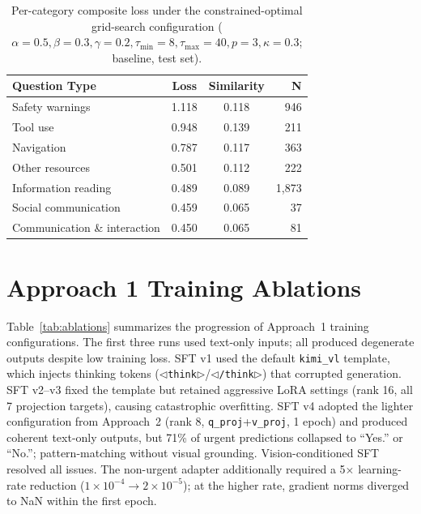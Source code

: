 \documentclass{article}
\begin{document}
\begin{table}[H]
\centering
\caption{Per-category composite loss under the constrained-optimal grid-search configuration ($\alpha\!=\!0.5, \beta\!=\!0.3, \gamma\!=\!0.2, \tau_{\min}\!=\!8, \tau_{\max}\!=\!40, p\!=\!3, \kappa\!=\!0.3$; baseline, test set).}
\label{tab:per_type}
\begin{tabular}{lccr}
\toprule
\textbf{Question Type} & \textbf{Loss} & \textbf{Similarity} & \textbf{N} \\
\midrule
Safety warnings              & 1.118 & 0.118 & 946 \\
Tool use                     & 0.948 & 0.139 & 211 \\
Navigation                   & 0.787 & 0.117 & 363 \\
Other resources              & 0.501 & 0.112 & 222 \\
Information reading          & 0.489 & 0.089 & 1{,}873 \\
Social communication         & 0.459 & 0.065 & 37 \\
Communication \& interaction & 0.450 & 0.065 & 81 \\
\bottomrule
\end{tabular}
\end{table}



\section{Approach 1 Training Ablations}\label{app:ablations}
 
Table~\ref{tab:ablations} summarizes the progression of Approach~1 training configurations. The first three runs used text-only inputs; all produced degenerate outputs despite low training loss. SFT v1 used the default \texttt{kimi\_vl} template, which injects thinking tokens (\texttt{{\small$\triangleleft$}think$\triangleright$}/\texttt{{\small$\triangleleft$}/think$\triangleright$}) that corrupted generation. SFT v2--v3 fixed the template but retained aggressive LoRA settings (rank 16, all 7 projection targets), causing catastrophic overfitting. SFT v4 adopted the lighter configuration from Approach~2 (rank 8, \texttt{q\_proj}+\texttt{v\_proj}, 1 epoch) and produced coherent text-only outputs, but 71\% of urgent predictions collapsed to ``Yes.'' or ``No.''; pattern-matching without visual grounding. Vision-conditioned SFT resolved all issues. The non-urgent adapter additionally required a 5$\times$ learning-rate reduction ($1 \times 10^{-4} \to 2 \times 10^{-5}$); at the higher rate, gradient norms diverged to NaN within the first epoch.
 
\end{document}
